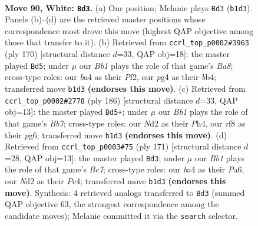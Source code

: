 \documentclass[11pt]{article}
\begin{document}
\clearpage

\begin{figure}[p]\centering
\begin{subfigure}{0.46\textwidth}\centering
\resizebox{\linewidth}{!}{%
\newchessgame
\chessboard[
  setfen={5r2/3k1p2/n5p1/4P2p/b4Pp1/8/3N1K1P/1B6 w - - 38 90},
  showmover=false,
  pgfstyle=straightmove, color=movearrow, markmove={b1-d3}
]}
\caption{}
\end{subfigure}\hfill
\begin{subfigure}{0.46\textwidth}\centering
\resizebox{\linewidth}{!}{%
\newchessgame
\chessboard[
  setfen={B7/8/5k2/p4p2/PbP1p1p1/4P1P1/5P2/3K4 w - - 42 86},
  showmover=false,
  pgfstyle=straightmove, color=movearrow, markmove={a8-d5}
]}
\caption{}
\end{subfigure}
\\[4pt]
\begin{subfigure}{0.46\textwidth}\centering
\resizebox{\linewidth}{!}{%
\newchessgame
\chessboard[
  setfen={8/1B3k2/6p1/2p1pp1p/2P1p2P/6P1/4K3/8 w - - 70 94},
  showmover=false,
  pgfstyle=straightmove, color=movearrow, markmove={b7-d5}
]}
\caption{}
\end{subfigure}\hfill
\begin{subfigure}{0.46\textwidth}\centering
\resizebox{\linewidth}{!}{%
\newchessgame
\chessboard[
  setfen={8/5k1p/p1p4P/5P2/p1pB1K2/2P5/1Pb5/8 b - - 73 86},
  showmover=false,
  pgfstyle=straightmove, color=movearrow, markmove={c2-d3}
]}
\caption{}
\end{subfigure}
\caption{\textbf{Move 90, White: \texttt{Bd3}.} (a) Our position; Melanie plays \texttt{Bd3} (\texttt{b1d3}). Panels (b)--(d) are the retrieved master positions whose correspondence most drove this move (highest QAP objective among those that transfer to it). (b) Retrieved from \texttt{ccrl\_top\_p0002\#3963} (ply 170) [structural distance $d$=33, QAP obj=18]: the master played \texttt{Bd5}; under $\mu$ our \emph{Bb1} plays the role of that game's \emph{Ba8}; cross-type roles: our \emph{b}a4 as their \emph{P}f2, our \emph{p}g4 as their \emph{b}b4; transferred move \texttt{b1d3} \textbf{(endorses this move)}. (c) Retrieved from \texttt{ccrl\_top\_p0002\#2778} (ply 186) [structural distance $d$=33, QAP obj=13]: the master played \texttt{Bd5+}; under $\mu$ our \emph{Bb1} plays the role of that game's \emph{Bb7}; cross-type roles: our \emph{N}d2 as their \emph{P}h4, our \emph{r}f8 as their \emph{p}g6; transferred move \texttt{b1d3} \textbf{(endorses this move)}. (d) Retrieved from \texttt{ccrl\_top\_p0003\#75} (ply 171) [structural distance $d$=28, QAP obj=13]: the master played \texttt{Bd3}; under $\mu$ our \emph{Bb1} plays the role of that game's \emph{Bc7}; cross-type roles: our \emph{b}a4 as their \emph{P}a6, our \emph{N}d2 as their \emph{P}c4; transferred move \texttt{b1d3} \textbf{(endorses this move)}. Synthesis: 4 retrieved analogs transferred to \texttt{Bd3} (summed QAP objective 63, the strongest correspondence among the candidate moves); Melanie committed it via the \texttt{search} selector.}
\label{fig:thought-m178}
\end{figure}
\end{document}

